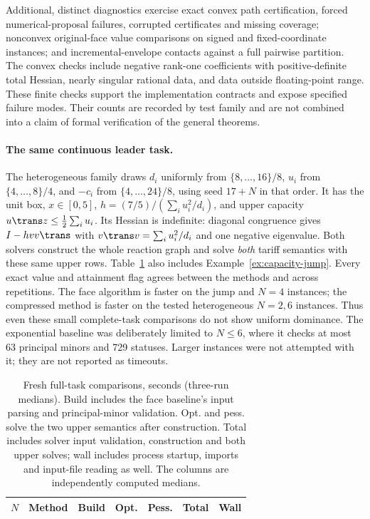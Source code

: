 Additional, distinct diagnostics exercise exact convex path certification,
forced numerical-proposal failures, corrupted certificates and missing coverage;
nonconvex original-face value comparisons on signed and fixed-coordinate
instances; and incremental-envelope contacts against a full pairwise partition.
The convex checks include negative rank-one coefficients with positive-definite
total Hessian, nearly singular rational data, and data outside floating-point
range. These finite checks support the implementation contracts and expose
specified failure modes. Their counts are recorded by test family and are not
combined into a claim of formal verification of the general theorems.

\paragraph{The same continuous leader task.}
The heterogeneous family draws $d_i$ uniformly from
$\{8,\ldots,16\}/8$, $u_i$ from $\{4,\ldots,8\}/4$, and $-c_i$ from
$\{4,\ldots,24\}/8$, using seed $17+N$ in that order. It has the unit box,
$x\in[0,5]$, $h=(7/5)/(\sum_i u_i^2/d_i)$, and upper capacity
$u\trans z\le\tfrac12\sum_i u_i$. Its Hessian is indefinite: diagonal
congruence gives $I-hvv\trans$ with $v\trans v=\sum_i u_i^2/d_i$ and one
negative eigenvalue. Both solvers construct the whole reaction graph and solve
\emph{both} tariff semantics with these same upper rows.
Table~\ref{tab:full-task} also includes Example~\ref{ex:capacity-jump}.
Every exact value and attainment flag agrees between the methods and across
repetitions. The face algorithm is faster on the jump and $N=4$ instances;
the compressed method is faster on the tested heterogeneous $N=2,6$ instances.
Thus even these small complete-task comparisons do not show uniform dominance.
The exponential baseline was deliberately limited to $N\le6$, where it checks
at most 63 principal minors and 729 statuses. Larger instances were not
attempted with it; they are not reported as timeouts.

\begin{table}[t]
\centering\small
\caption{Fresh full-task comparisons, seconds (three-run medians).
Build includes the face baseline's input parsing and principal-minor validation.
Opt. and pess. solve the two upper semantics after construction.
Total includes solver input validation, construction and both upper solves;
wall includes process startup, imports and input-file reading as well.
The columns are independently computed medians.}
\label{tab:full-task}
\begin{tabular}{llrrrrr}\toprule
$N$ & Method & Build & Opt. & Pess. & Total & Wall\\\midrule
\end{tabular}
\end{table}

